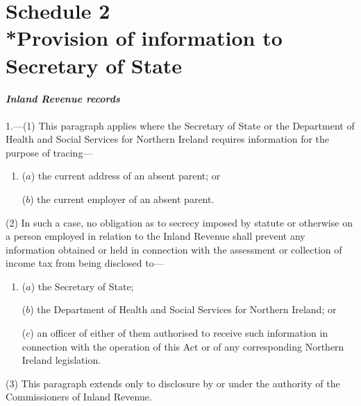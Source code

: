 \documentclass[12pt,a4paper]{article}
\begin{document}

\part[Schedule 2 --- Provision of information to Secretary of State]{Schedule 2\\*Provision of information to Secretary of State}

\renewcommand\parthead{--- Schedule 2}

\subsection*{\itshape Inland Revenue records}

1.---(1) This paragraph applies where the Secretary of State or the Department of Health and Social Services for Northern Ireland requires information for the purpose of tracing—
\begin{enumerate}\item[]
($a$) the current address of an absent parent; or

($b$) the current employer of an absent parent.
\end{enumerate}

(2) In such a case, no obligation as to secrecy imposed by statute or otherwise on a person employed in relation to the Inland Revenue shall prevent any information obtained or held in connection with the assessment or collection of income tax from being disclosed to—
\begin{enumerate}\item[]
($a$) the Secretary of State;

($b$) the Department of Health and Social Services for Northern Ireland; or

($c$) an officer of either of them authorised to receive such information in connection with the operation of this Act or of any corresponding Northern Ireland legislation.
\end{enumerate}

(3) This paragraph extends only to disclosure by or under the authority of the Commissioners of Inland Revenue.
\end{document}
